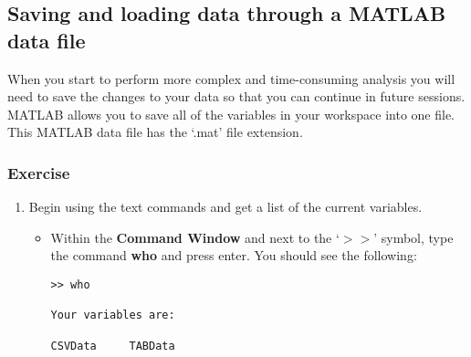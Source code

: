 \documentclass[12pt,a4paper]{article}
\begin{document}
\subsection{Saving and loading data through a MATLAB data file}
When you start to perform more complex and time-consuming analysis you will need to save the changes to your data so that you can continue in future sessions.  
MATLAB allows you to save all of the variables in your workspace into one file.  
This MATLAB data file has the `.mat' file extension.
\subsubsection*{Exercise}
\begin{enumerate}
	\item Begin using the text commands and get a list of the current variables.
	\begin{itemize}
		\item Within the \textbf{Command Window} and next to the `$>>$' symbol, type the command \textbf{who} and press enter.	You should see the following:
		\begin{lstlisting}[style=Matlab-editor]
>> who
		
Your variables are:
		
CSVData 	TABData
		\end{lstlisting}	
		

\end{itemize}
\end{enumerate}
\end{document}
